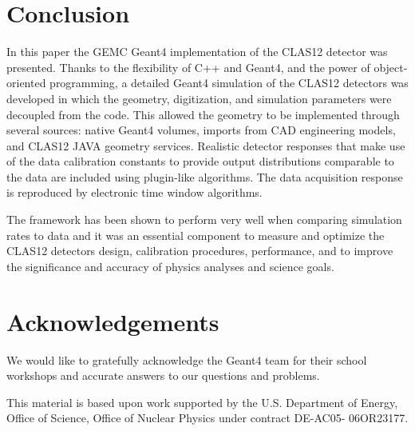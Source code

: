 \section{Conclusion}
In this paper the GEMC Geant4 implementation of the CLAS12 detector was presented.
Thanks to the flexibility of C++ and Geant4, and the power of object-oriented programming,
a detailed Geant4 simulation of the CLAS12 detectors was developed in which the geometry,
digitization, and simulation parameters were decoupled from the code.
This allowed the geometry to be implemented through several sources: native Geant4 volumes, imports from CAD engineering models,
and CLAS12 JAVA geometry services. Realistic detector responses that
make use of the data calibration constants to provide output distributions comparable to the data are included
using plugin-like algorithms. The data acquisition response is reproduced by electronic time window algorithms.

The framework has been shown to perform very well when comparing simulation rates to data
and it was an essential component to measure and optimize the CLAS12 detectors design, calibration procedures, performance,
and to improve the significance and accuracy of physics analyses and science goals.

\section{Acknowledgements}

We would like to gratefully acknowledge the Geant4 team
for their school workshops and accurate answers to our questions and problems.

This material is based upon work supported by the U.S. Department of Energy,
Office of Science, Office of Nuclear Physics under contract DE-AC05- 06OR23177.

